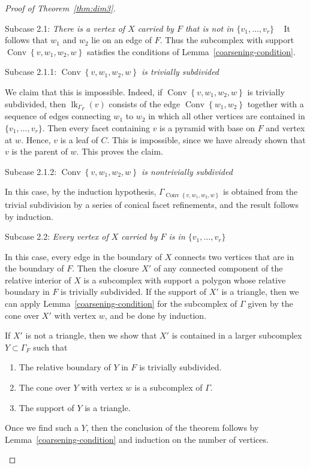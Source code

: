 \documentclass[ALCO,ThmDefs,Unicode,epreuves]{cedram}
\DeclareMathOperator{\Convop}{Conv}
\newcommand{\Conv}[1]{\Convop\left\{{#1}\right\}}
\DeclareMathOperator{\lk}{lk}
\newenvironment{proofsection}[2]{\begin{enonce*}[remark]{#1 \emph{#2}} \ }{\end{enonce*}}
\begin{document}
\begin{proof}[Proof of Theorem~\ref{thm:dim3}]
\begin{proofsection}{Subcase 2.1:} {There is a vertex of $X$ carried by $F$ that is not in $\{ v_1, \ldots, v_r \}$}
It follows that $w_1$ and $w_2$ lie on an edge of $F$. Thus the subcomplex with support $\Conv{v,w_1,w_2,w}$ satisfies the conditions of Lemma~\ref{coarsening-condition}. 
\end{proofsection}

\begin{proofsection}{Subcase 2.1.1:}{$\Conv{v,w_1,w_2,w}$ is trivially subdivided}

We claim that this is impossible. Indeed, if $\Conv{v,w_1,w_2,w}$ is trivially subdivided, then $\lk_{\Gamma_F}(v)$ consists of the edge $\Conv{w_1, w_2}$ together with a sequence of edges connecting $w_1$ to $w_2$ in which all other vertices are contained in $\{ v_1, \ldots, v_r \}$. Then every facet containing $v$ is a pyramid with base on $F$ and vertex at $w$. Hence, $v$ is a leaf of $C$. This is impossible, since we have already shown that $v$ is the parent of $w$. This proves the claim.
\end{proofsection}

\begin{proofsection}{Subcase 2.1.2:}{$\Conv{v,w_1,w_2,w}$ is nontrivially subdivided}

In this case, by the induction hypothesis, $\Gamma_{\Conv{v,w_1,w_2,w}}$ is obtained from the trivial subdivision by a series of conical facet refinements, and the result follows by induction.
\end{proofsection}

\begin{proofsection}{Subcase 2.2:}{Every vertex of $X$ carried by $F$ is in $\{v_1, \ldots, v_r\}$}

In this case, every edge in the boundary of $X$ connects two vertices that are in the boundary of $F$. Then the closure $X'$ of any connected component of the relative interior of $X$ is a subcomplex with support a polygon whose relative boundary in $F$ is trivially subdivided. If the support of $X'$ is a triangle, then we can apply Lemma~\ref{coarsening-condition} for the subcomplex of $\Gamma$ given by the cone over $X'$ with vertex $w$, and be done by induction.

If $X'$ is not a triangle, then we show that $X'$ is contained in a larger subcomplex $Y \subset \Gamma_F$ such that 
\begin{enumerate}
\item\label{subcase2.2_1} The relative boundary of $Y$ in $F$ is trivially subdivided.
\item\label{subcase2.2_2} The cone over $Y$ with vertex $w$ is a subcomplex of $\Gamma$.
\item\label{subcase2.2_3} The support of $Y$ is a triangle.
\end{enumerate}
Once we find such a $Y$, then the conclusion of the theorem follows by Lemma~\ref{coarsening-condition} and induction on the number of vertices.


\end{proofsection}
\end{proof}
\end{document}
